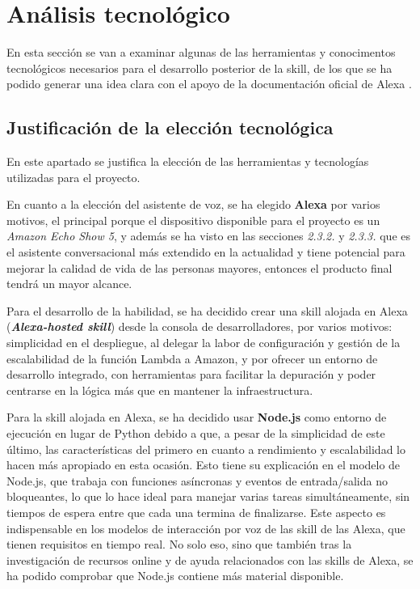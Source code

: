 \section{Análisis tecnológico}

En esta sección se van a examinar algunas de las herramientas y conocimentos tecnológicos necesarios para el desarrollo posterior de la skill, de los que se ha podido generar una idea clara con el apoyo de la documentación oficial de Alexa \parencite{alexaDocs}.

\subsection{Justificación de la elección tecnológica}

En este apartado se justifica la elección de las herramientas y tecnologías utilizadas para el proyecto.

En cuanto a la elección del asistente de voz, se ha elegido \textbf{Alexa} por varios motivos, el principal porque el dispositivo disponible para el proyecto es un \textit{Amazon Echo Show 5}, y además se ha visto en las secciones \textit{2.3.2.} y \textit{2.3.3.} que es el asistente conversacional más extendido en la actualidad y tiene potencial para mejorar la calidad de vida de las personas mayores, entonces el producto final tendrá un mayor alcance.

Para el desarrollo de la habilidad, se ha decidido crear una skill alojada en Alexa (\textit{\textbf{Alexa-hosted skill}}) desde la consola de desarrolladores, por varios motivos: simplicidad en el despliegue, al delegar la labor de configuración y gestión de la escalabilidad de la función Lambda a Amazon, y por ofrecer un entorno de desarrollo integrado, con herramientas para facilitar la depuración y poder centrarse en la lógica más que en mantener la infraestructura. 

Para la skill alojada en Alexa, se ha decidido usar \textbf{Node.js} como entorno de ejecución en lugar de Python debido a que, a pesar de la simplicidad de este último, las características del primero en cuanto a rendimiento y escalabilidad lo hacen más apropiado en esta ocasión. Esto tiene su explicación en el modelo de Node.js, que trabaja con funciones asíncronas y eventos de entrada/salida no bloqueantes, lo que lo hace ideal para manejar varias tareas simultáneamente, sin tiempos de espera entre que cada una termina de finalizarse. Este aspecto es indispensable en los modelos de interacción por voz de las skill de las Alexa, que tienen requisitos en tiempo real. No solo eso, sino que también tras la investigación de recursos online y de ayuda relacionados con las skills de Alexa, se ha podido comprobar que Node.js contiene más material disponible.

